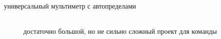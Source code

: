 \clearpage
{}\secdown

\begin{description}
    \item[универсальный мультиметр с автопределами]\ \\
    достаточно большой, но не сильно сложный проект для команды
\end{description}

\secup
